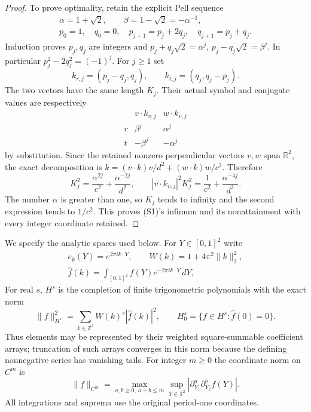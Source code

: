 \begin{proof}
To prove optimality, retain the explicit Pell sequence
\[
 \begin{gathered}
 \alpha=1+\sqrt2,\qquad\beta=1-\sqrt2=-\alpha^{-1},\\
 p_0=1,\quad q_0=0,\quad
 p_{j+1}=p_j+2q_j,\quad q_{j+1}=p_j+q_j.
 \end{gathered}                                                   \tag{S3}
\]
Induction proves $p_j,q_j$ are integers and
$p_j+q_j\sqrt2=\alpha^j$, $p_j-q_j\sqrt2=\beta^j$.
In particular $p_j^2-2q_j^2=(-1)^j$. For $j\geq1$ set
\[
 k_{r,j}=(p_j-q_j,q_j),\qquad
 k_{t,j}=(q_j,q_j-p_j).
\]
The two vectors have the same length $K_j$. Their actual symbol
and conjugate values are respectively
\[
 \begin{array}{c|cc}
 &v\cdot k_{v,j}&w\cdot k_{v,j}\\\hline
 r&\beta^j&\alpha^j\\
 t&-\beta^j&-\alpha^j
 \end{array}
\]
by substitution. Since the retained nonzero perpendicular vectors
$v,w$ span $\mathbb R^2$, the exact decomposition is
$k=(v\cdot k)v/d^2+(w\cdot k)w/c^2$. Therefore
\[
 K_j^2=\frac{\alpha^{2j}}{c^2}+\frac{\alpha^{-2j}}{d^2},
 \qquad
 |v\cdot k_{v,j}|^2K_j^2
       =\frac1{c^2}+\frac{\alpha^{-4j}}{d^2}.          \tag{S4}
\]
The number $\alpha$ is greater than one, so $K_j$ tends to infinity
and the second expression tends to $1/c^2$. This proves (S1)'s
infimum and its nonattainment with every integer coordinate retained.
\end{proof}

We specify the analytic spaces used below. For $Y\in[0,1]^2$ write
\[
 \begin{gathered}
 e_k(Y)=e^{2\pi i k\cdot Y},\qquad W(k)=1+4\pi^2\|k\|_2^2,\\
 \widehat f(k)=\int_{[0,1]^2}f(Y)e^{-2\pi i k\cdot Y}\,dY,
 \end{gathered}
\]
For real $s$, $H^s$ is the completion of finite trigonometric
polynomials with the exact norm
\[
 \|f\|_{H^s}^2=\sum_{k\in\mathbb Z^2}W(k)^s|\widehat f(k)|^2,
 \qquad H^s_0=\{f\in H^s:\widehat f(0)=0\}.           \tag{S5}
\]
Thus elements may be represented by their weighted square-summable
coefficient arrays; truncation of such arrays converges in this norm
because the defining nonnegative series has vanishing tails.
For integer $m\geq0$ the coordinate norm on $C^m$ is
\[
 \|f\|_{C^m}=\max_{a,b\geq0,\ a+b\leq m}
          \sup_{Y\in\mathbb T^2}|\partial_{Y_1}^a\partial_{Y_2}^bf(Y)|.
                                                               \tag{S6}
\]
All integrations and suprema use the original period-one coordinates.

